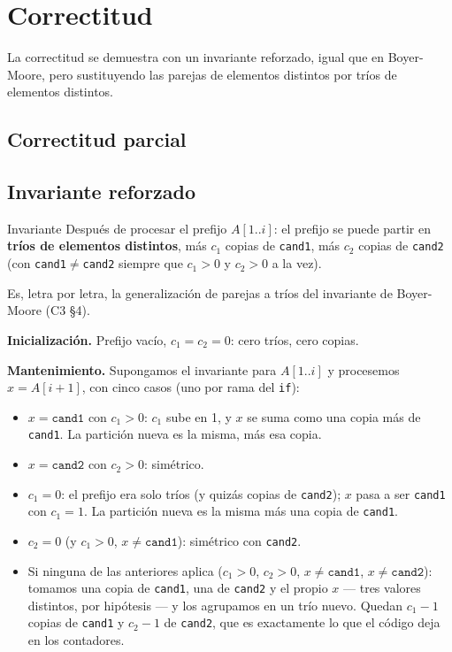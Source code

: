 \documentclass[11pt]{article}
\begin{document}
\section{Correctitud}

La correctitud se demuestra con un invariante reforzado, igual que en Boyer-Moore, pero sustituyendo las
parejas de elementos distintos por tríos de elementos distintos.

\subsection*{Correctitud parcial}

\subsection*{Invariante reforzado}

\begin{resultado}{Invariante}
Después de procesar el prefijo $A[1..i]$: el prefijo se puede partir en \textbf{tríos de elementos
distintos}, más $c_1$ copias de \texttt{cand1}, más $c_2$ copias de \texttt{cand2} (con
\texttt{cand1}$\ne$\texttt{cand2} siempre que $c_1>0$ y $c_2>0$ a la vez).
\end{resultado}

Es, letra por letra, la generalización de parejas a tríos del invariante de Boyer-Moore (C3 §4).

\textbf{Inicialización.} Prefijo vacío, $c_1=c_2=0$: cero tríos, cero copias.

\textbf{Mantenimiento.} Supongamos el invariante para $A[1..i]$ y procesemos $x=A[i{+}1]$, con cinco casos
(uno por rama del \texttt{if}):
\begin{itemize}
\item $x=\texttt{cand1}$ con $c_1>0$: $c_1$ sube en 1, y $x$ se suma como una copia más de \texttt{cand1}.
La partición nueva es la misma, más esa copia.
\item $x=\texttt{cand2}$ con $c_2>0$: simétrico.
\item $c_1=0$: el prefijo era solo tríos (y quizás copias de \texttt{cand2}); $x$ pasa a ser
\texttt{cand1} con $c_1=1$. La partición nueva es la misma más una copia de \texttt{cand1}.
\item $c_2=0$ (y $c_1>0$, $x\ne\texttt{cand1}$): simétrico con \texttt{cand2}.
\item Si ninguna de las anteriores aplica ($c_1>0$, $c_2>0$, $x\ne\texttt{cand1}$, $x\ne\texttt{cand2}$):
tomamos una copia de \texttt{cand1}, una de \texttt{cand2} y el propio $x$ --- tres valores distintos, por
hipótesis --- y los agrupamos en un trío nuevo. Quedan $c_1{-}1$ copias de \texttt{cand1} y $c_2{-}1$ de
\texttt{cand2}, que es exactamente lo que el código deja en los contadores.
\end{itemize}
\end{document}
